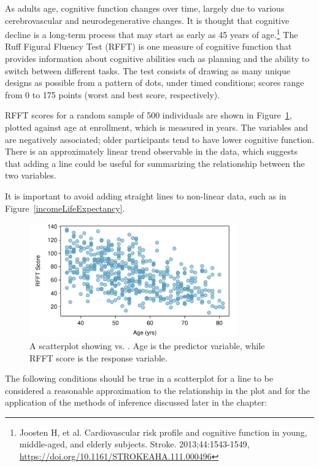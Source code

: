 As adults age, cognitive function changes over time, largely due to various cerebrovascular and neurodegenerative changes. It is thought that cognitive decline is a long-term process that may start as early as 45 years of age.\footnote{Joosten H, et al. Cardiovascular risk profile and cognitive function in young, middle-aged, and elderly subjects. Stroke. 2013;44:1543-1549, \url{https://doi.org/10.1161/STROKEAHA.111.000496} } The Ruff Figural Fluency Test (RFFT) is one measure of cognitive function that provides information about cognitive abilities such as planning and the ability to switch between different tasks. The test consists of drawing as many unique designs as possible from a pattern of dots, under timed conditions; scores range from 0 to 175 points (worst and best score, respectively).

RFFT scores for a random sample of 500 individuals are shown in Figure~\ref{prevendAgeRFFT}, plotted against age at enrollment, which is measured in years. The variables  and  are negatively associated; older participants tend to have lower cognitive function. There is an approximately linear trend observable in the data, which suggests that adding a line could be useful for summarizing the relationship between the two variables.

It is important to avoid adding straight lines to non-linear data, such as in  Figure~\ref{incomeLifeExpectancy}.

\begin{figure}[h]
	\centering
	\includegraphics[width=0.8\textwidth]
	{ch_simple_linear_regression_oi_biostat/figures/prevendAgeRFFTPlot/prevendAgeRFFTPlot}
	\caption{A scatterplot showing  vs. . Age is the predictor variable, while RFFT score is the response variable.}
	\label{prevendAgeRFFT}
\end{figure}

\textD{\newpage}

The following conditions should be true in a scatterplot for a line to be considered a reasonable approximation to the relationship in the plot and for the application of the methods of inference discussed later in the chapter:

